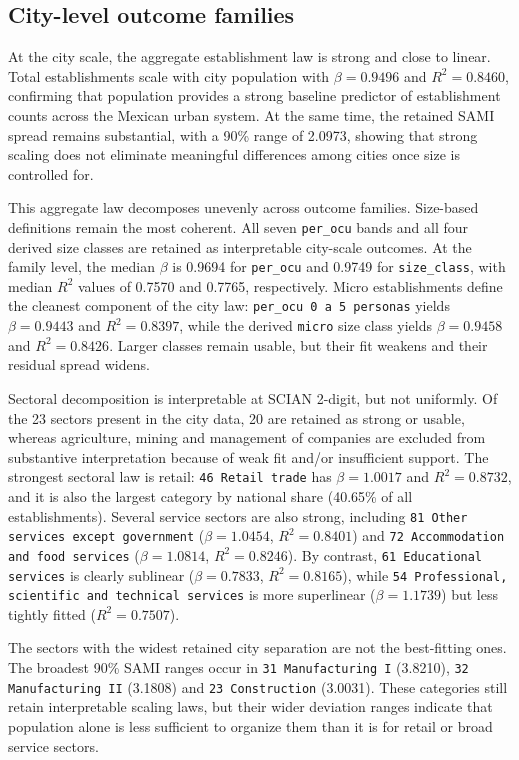 \documentclass[11pt]{article}
\begin{document}
\subsection*{City-level outcome families}
At the city scale, the aggregate establishment law is strong and close to linear. Total establishments scale with city population with $\beta = 0.9496$ and $R^2 = 0.8460$, confirming that population provides a strong baseline predictor of establishment counts across the Mexican urban system. At the same time, the retained SAMI spread remains substantial, with a 90\% range of 2.0973, showing that strong scaling does not eliminate meaningful differences among cities once size is controlled for.

This aggregate law decomposes unevenly across outcome families. Size-based definitions remain the most coherent. All seven \texttt{per\_ocu} bands and all four derived size classes are retained as interpretable city-scale outcomes. At the family level, the median $\beta$ is 0.9694 for \texttt{per\_ocu} and 0.9749 for \texttt{size\_class}, with median $R^2$ values of 0.7570 and 0.7765, respectively. Micro establishments define the cleanest component of the city law: \texttt{per\_ocu 0 a 5 personas} yields $\beta = 0.9443$ and $R^2 = 0.8397$, while the derived \texttt{micro} size class yields $\beta = 0.9458$ and $R^2 = 0.8426$. Larger classes remain usable, but their fit weakens and their residual spread widens.

Sectoral decomposition is interpretable at SCIAN 2-digit, but not uniformly. Of the 23 sectors present in the city data, 20 are retained as strong or usable, whereas agriculture, mining and management of companies are excluded from substantive interpretation because of weak fit and/or insufficient support. The strongest sectoral law is retail: \texttt{46 Retail trade} has $\beta = 1.0017$ and $R^2 = 0.8732$, and it is also the largest category by national share (40.65\% of all establishments). Several service sectors are also strong, including \texttt{81 Other services except government} ($\beta = 1.0454$, $R^2 = 0.8401$) and \texttt{72 Accommodation and food services} ($\beta = 1.0814$, $R^2 = 0.8246$). By contrast, \texttt{61 Educational services} is clearly sublinear ($\beta = 0.7833$, $R^2 = 0.8165$), while \texttt{54 Professional, scientific and technical services} is more superlinear ($\beta = 1.1739$) but less tightly fitted ($R^2 = 0.7507$).

The sectors with the widest retained city separation are not the best-fitting ones. The broadest 90\% SAMI ranges occur in \texttt{31 Manufacturing I} (3.8210), \texttt{32 Manufacturing II} (3.1808) and \texttt{23 Construction} (3.0031). These categories still retain interpretable scaling laws, but their wider deviation ranges indicate that population alone is less sufficient to organize them than it is for retail or broad service sectors.
\end{document}
